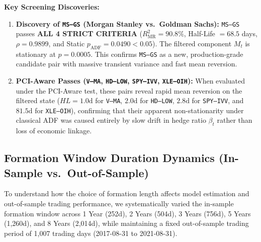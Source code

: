 \documentclass[11pt, a4paper]{article}
\begin{document}
\noindent\textbf{Key Screening Discoveries:}
\begin{enumerate}
    \item \textbf{Discovery of \texttt{MS--GS} (Morgan Stanley vs.\ Goldman Sachs):} \texttt{MS--GS} passes \textbf{ALL 4 STRICT CRITERIA} ($R^2_{\text{MR}} = 90.8\%$, Half-Life $= 68.5$ days, $\rho = 0.9899$, and Static $p_{\text{ADF}} = 0.0490 < 0.05$). The filtered component $M_t$ is stationary at $p = 0.0005$. This confirms \texttt{MS--GS} as a new, production-grade candidate pair with massive transient variance and fast mean reversion.
    \item \textbf{PCI-Aware Passes (\texttt{V--MA}, \texttt{HD--LOW}, \texttt{SPY--IVV}, \texttt{XLE--OIH}):} When evaluated under the PCI-Aware test, these pairs reveal rapid mean reversion on the filtered state ($HL = 1.0\text{d}$ for \texttt{V--MA}, $2.0\text{d}$ for \texttt{HD--LOW}, $2.8\text{d}$ for \texttt{SPY--IVV}, and $81.5\text{d}$ for \texttt{XLE--OIH}), confirming that their apparent non-stationarity under classical ADF was caused entirely by slow drift in hedge ratio $\beta_t$ rather than loss of economic linkage.
\end{enumerate}

\subsection{Formation Window Duration Dynamics (In-Sample vs.\ Out-of-Sample)}
\label{sec:window_dynamics}

To understand how the choice of formation length affects model estimation and out-of-sample trading performance, we systematically varied the in-sample formation window across 1 Year (252d), 2 Years (504d), 3 Years (756d), 5 Years (1,260d), and 8 Years (2,014d), while maintaining a fixed out-of-sample trading period of 1,007 trading days (2017-08-31 to 2021-08-31).
\end{document}
